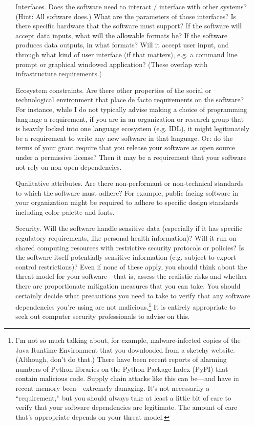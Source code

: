 \documentclass[12pt,oneside]{book}
\begin{document}
\begin{itemize}[wide, labelwidth=!, labelindent=0pt, font=\bfseries]
\item[Interfaces.] Does the software need to interact / interface with other systems? (Hint: All software does.) What are the parameters of those interfaces? Is there specific hardware that the software must support? If the software will accept data inputs, what will the allowable formats be? If the software produces data outputs, in what formats? Will it accept user input, and through what kind of user interface (if that matters), e.g. a command line prompt or graphical windowed application? (These overlap with infrastructure requirements.)

\item[Ecosystem constraints.] Are there other properties of the social or technological environment that place de facto requirements on the software? For instance, while I do not typically advise making a choice of programming language a requirement, if you are in an organization or research group that is heavily locked into one language ecosystem (e.g. IDL), it might legitimately be a requirement to write any new software in that language. Or: do the terms of your grant require that you release your software as open source under a permissive license? Then it may be a requirement that your software not rely on non-open dependencies.

\item[Qualitative attributes.] Are there non-performant or non-technical standards to which the software must adhere? For example, public facing software in your organization might be required to adhere to specific design standards including color palette and fonts.

\item[Security.] Will the software handle sensitive data (especially if it has specific regulatory requirements, like personal health information)? Will it run on shared computing resources with restrictive security protocols or policies? Is the software itself potentially sensitive information (e.g. subject to export control restrictions)? Even if none of these apply, you should think about the threat model for your software---that is, assess the realistic risks and whether there are proportionate mitigation measures that you can take. You should certainly decide what precautions you need to take to verify that any software dependencies you're using are not malicious.\footnote{I'm not so much talking about, for example, malware-infected copies of the Java Runtime Environment that you downloaded from a sketchy website. (Although, don't do that.) There have been recent reports of alarming numbers of Python libraries on the Python Package Index (PyPI) that contain malicious code. Supply chain attacks like this can be---and have in recent memory been---extremely damaging. It's not necessarily a ``requirement,'' but you should always take at least a little bit of care to verify that your software dependencies are legitimate. The amount of care that's appropriate depends on your threat model.} It is entirely appropriate to seek out computer security professionals to advise on this.
\end{itemize}
\end{document}
